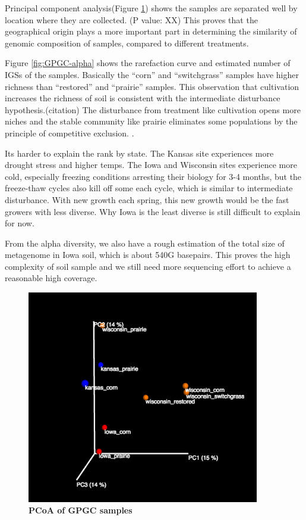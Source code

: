 Principal component analysis(Figure \ref{fig:GPGC_beta}) shows the samples are 
separated well by location where they are collected. (P value: XX)
This proves that the geographical origin plays a more important part in 
determining the similarity of genomic composition of samples, compared to 
different treatments.

Figure \ref{fig:GPGC-alpha} shows the rarefaction curve and estimated number 
of IGSs of the samples. Basically the ``corn'' and ``switchgrass'' samples
have higher richness than ``restored'' and ``prairie'' samples. This observation 
that cultivation increases the richness of soil 
is consistent with the intermediate disturbance hypothesis.(citation) The disturbance 
from treatment like cultivation opens more niches and the stable 
community like prairie eliminates some populations by the principle of 
competitive exclusion. . 

Its harder to explain the rank by state. 
The Kansas site experiences more drought stress and higher temps. 
The Iowa and 
Wisconsin sites experience more cold, especially freezing conditions arresting 
their biology for 3-4 months, but the freeze-thaw cycles also kill off 
some each cycle, which is similar to intermediate disturbance. With new 
growth each spring, this new growth would be the fast growers with 
less diverse. Why Iowa is the least diverse is still difficult to explain for now.

 From the alpha diversity, we also have a rough estimation of the  total 
 size of metagenome in Iowa soil, which is about 540G basepairs. This 
 proves the high complexity of soil sample and we still need more sequencing 
 effort to achieve a reasonable high coverage.
 

\begin{figure}[!ht]
 \centerline{\includegraphics[width=4in]{./figures/GPGC_old_subset1M.png}}
\caption{\bf PCoA  of GPGC samples}
\label{fig:GPGC_beta}
\end{figure}



